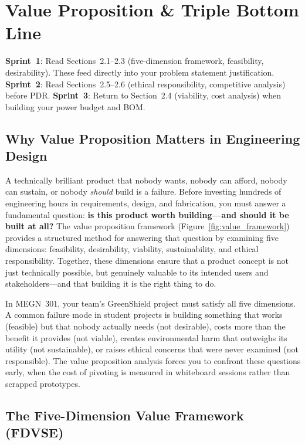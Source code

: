 \chapter{Value Proposition \& Triple Bottom Line}\label{ch:value}

\begin{tipbox}
\textbf{Sprint~1}: Read Sections~2.1--2.3 (five-dimension framework, feasibility, desirability). These feed directly into your problem statement justification. \textbf{Sprint~2}: Read Sections~2.5--2.6 (ethical responsibility, competitive analysis) before PDR. \textbf{Sprint~3}: Return to Section~2.4 (viability, cost analysis) when building your power budget and BOM.
\end{tipbox}

\section{Why Value Proposition Matters in Engineering Design}
A technically brilliant product that nobody wants, nobody can afford, nobody can sustain, or nobody \emph{should} build is a failure. Before investing hundreds of engineering hours in requirements, design, and fabrication, you must answer a fundamental question: \textbf{is this product worth building---and should it be built at all?} The value proposition framework (Figure~\ref{fig:value_framework}) provides a structured method for answering that question by examining five dimensions: feasibility, desirability, viability, sustainability, and ethical responsibility. Together, these dimensions ensure that a product concept is not just technically possible, but genuinely valuable to its intended users and stakeholders---and that building it is the right thing to do.

In MEGN~301, your team's GreenShield project must satisfy all five dimensions. A common failure mode in student projects is building something that works (feasible) but that nobody actually needs (not desirable), costs more than the benefit it provides (not viable), creates environmental harm that outweighs its utility (not sustainable), or raises ethical concerns that were never examined (not responsible). The value proposition analysis forces you to confront these questions early, when the cost of pivoting is measured in whiteboard sessions rather than scrapped prototypes.

\section{The Five-Dimension Value Framework (FDVSE)}

